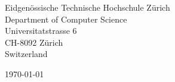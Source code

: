 \begin{minipage}{0.49\textwidth}
\begin{flushleft}
\noindent
Eidgenössische Technische Hochschule Zürich\\
Department of Computer Science \\
Universitatstrasse 6\\
CH-8092 Zürich\\
Switzerland
\end{flushleft}
\end{minipage}
\begin{minipage}{0.47\textwidth}
\begin{flushright}
\today
\end{flushright}
\end{minipage} \\

\newcommand{\univ}{Eidgenössische Technische Hochschule Zürich}
\newcommand{\univshort}{ETH Zurich}
\newcommand{\degree}{M.Sc.}
\newcommand{\dept}{Computer Science}
